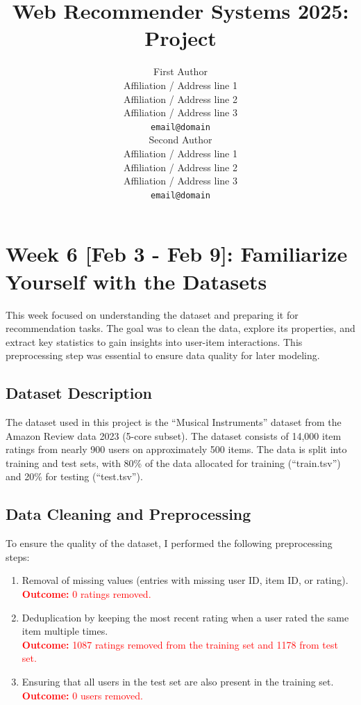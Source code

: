 \documentclass[11pt,a4paper]{article}
\title{Web Recommender Systems 2025: Project}
\author{First Author \\
  Affiliation / Address line 1 \\
  Affiliation / Address line 2 \\
  Affiliation / Address line 3 \\
  \texttt{email@domain} \\\And
  Second Author \\
  Affiliation / Address line 1 \\
  Affiliation / Address line 2 \\
  Affiliation / Address line 3 \\
  \texttt{email@domain} \\}
\date{}
\begin{document}
\maketitle

\section{Week 6 [Feb 3 - Feb 9]: Familiarize Yourself with the Datasets}

This week focused on understanding the dataset and preparing it for recommendation tasks. The goal was to clean the data, explore its properties, and extract key statistics to gain insights into user-item interactions. This preprocessing step was essential to ensure data quality for later modeling.

\subsection{Dataset Description}
The dataset used in this project is the ``Musical Instruments'' dataset from the Amazon Review data 2023 (5-core subset). The dataset consists of 14,000 item ratings from nearly 900 users on approximately 500 items. The data is split into training and test sets, with 80\% of the data allocated for training (``train.tsv'') and 20\% for testing (``test.tsv'').

\subsection{Data Cleaning and Preprocessing}
To ensure the quality of the dataset, I performed the following preprocessing steps:

\begin{enumerate}
    \item Removal of missing values (entries with missing user ID, item ID, or rating). \\ \textcolor{red}{\textbf{Outcome:} 0 ratings removed.}
    \item Deduplication by keeping the most recent rating when a user rated the same item multiple times. \\ \textcolor{red}{\textbf{Outcome:} 1087 ratings removed from the training set and 1178 from test set.}
    \item Ensuring that all users in the test set are also present in the training set. \\ \textcolor{red}{\textbf{Outcome:} 0 users removed.}
\end{enumerate}
\end{document}
